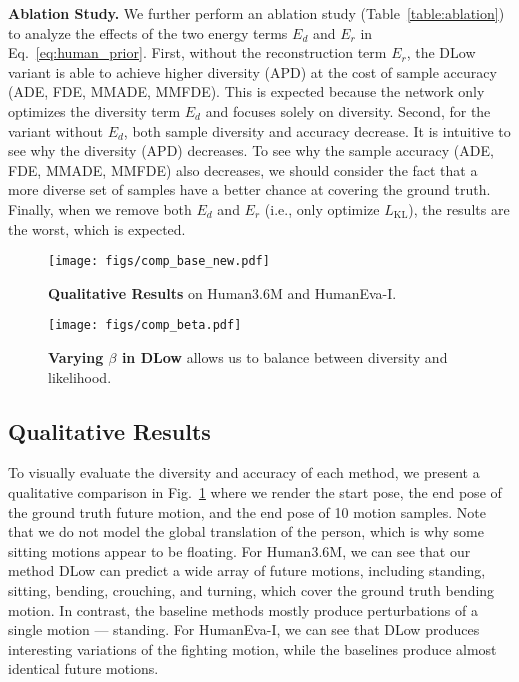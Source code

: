 \documentclass[runningheads]{llncs}
\begin{document}
	\vspace{1mm}
	\noindent\textbf{Ablation Study.}
	We further perform an ablation study (Table~\ref{table:ablation}) to analyze the effects of the two energy terms $E_d$ and $E_r$ in Eq.~\eqref{eq:human_prior}. First, without the reconstruction term $E_r$, the DLow variant is able to achieve higher diversity (APD) at the cost of sample accuracy (ADE, FDE, MMADE, MMFDE). This is expected because the network only optimizes the diversity term $E_d$ and focuses solely on diversity. Second, for the variant without $E_d$, both sample diversity and accuracy decrease. It is intuitive to see why the diversity (APD) decreases. To see why the sample accuracy (ADE, FDE, MMADE, MMFDE) also decreases, we should consider the fact that a more diverse set of samples have a better chance at covering the ground truth. Finally, when we remove both $E_d$ and $E_r$ (i.e., only optimize $L_\text{KL}$), the results are the worst, which is expected.
	
	\begin{figure}[t]
		\centering
		\texttt{[image: figs/comp\_base\_new.pdf]}
		\vspace{-7mm}
		\caption{\textbf{Qualitative Results} on Human3.6M and HumanEva-I.}
		\label{fig:comp_base}
		\vspace{-3mm}
	\end{figure}
	
	
	\begin{figure}[t]
		\centering
		\texttt{[image: figs/comp\_beta.pdf]}
		\vspace{-7mm}
		\caption{\textbf{Varying $\beta$ in DLow} allows us to balance between diversity and likelihood. }
		\label{fig:beta}
		\vspace{-5mm}
	\end{figure}
	
	
	\vspace{-3mm}
	\subsection{Qualitative Results}
	\vspace{-1mm}
	To visually evaluate the diversity and accuracy of each method, we present a qualitative comparison in Fig.~\ref{fig:comp_base} where we render the start pose, the end pose of the ground truth future motion, and the end pose of 10 motion samples. Note that we do not model the global translation of the person, which is why some sitting motions appear to be floating. For Human3.6M, we can see that our method DLow can predict a wide array of future motions, including standing, sitting, bending, crouching, and turning, which cover the ground truth bending motion. In contrast, the baseline methods mostly produce perturbations of a single motion --- standing. For HumanEva-I, we can see that DLow produces interesting variations of the fighting motion, while the baselines produce almost identical future motions.
	
\end{document}
